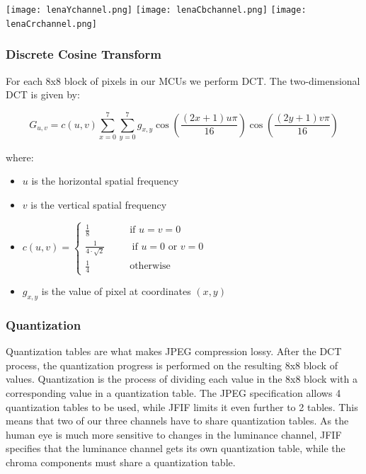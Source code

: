 \begin{infobox}
\begin{centering}
\texttt{[image: lenaYchannel.png]}
\texttt{[image: lenaCbchannel.png]}
\texttt{[image: lenaCrchannel.png]}
\label{fig:YCbCrChannels}
\end{centering}

\vspace{4mm}
\subsubsection{Discrete Cosine Transform}
\vspace{-2.5mm}

For each 8x8 block of pixels in our MCUs we perform DCT. The two-dimensional DCT is given by:

$$ G_{u,v} = c(u,v)\sum_{x=0}^{7}\sum_{y=0}^{7}g_{x,y}\cos{\left(\frac{(2x+1)u\pi}{16}\right)}\cos{\left(\frac{(2y+1)v\pi}{16}\right)} $$

where:
\begin{itemize}
	\item $u$ is the horizontal spatial frequency 
	\item $v$ is the vertical spatial frequency 
	\item $c(u,v) = \begin{cases}\frac{1}{8} \quad \quad \quad \quad\text{if } u=v=0\\ 
	                             \frac{1}{4 \cdot \sqrt{2}} \,~\quad\quad \text{ if } u = 0 \text{ or } v = 0\\
	                             \frac{1}{4} \quad \quad \quad \quad\text{otherwise}
	                             \end{cases} $
    \item $g_{x,y}$ is the value of pixel at coordinates $(x,y)$ 
\end{itemize}

\vspace{4mm}
\subsubsection{Quantization}
\vspace{-2.5mm}
Quantization tables are what makes JPEG compression lossy. 
After the DCT process, the quantization progress is performed on the resulting 8x8 block of values.
Quantization is the process of dividing each value in the 8x8 block with a corresponding value in a quantization table. 
The JPEG specification allows 4 quantization tables to be used, while JFIF limits it even further to 2 tables. 
This means that two of our three channels have to share quantization tables. 
As the human eye is much more sensitive to changes in the luminance channel, JFIF specifies that the luminance channel gets its own quantization table, while the chroma components must share a quantization table.


\end{infobox}
